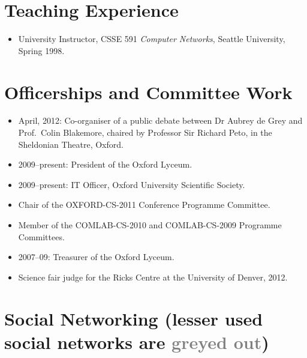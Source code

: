 \documentclass[12pt,letterpaper]{article}
\begin{document}
\vspace{-8mm}
\section*{Teaching Experience}

\begin{itemize}
    \item University Instructor, CSSE 591 \emph{Computer Networks},
    Seattle University, Spring 1998.
\end{itemize}

\vspace{-8mm}
\section*{Officerships and Committee Work}
\begin{itemize}
	\item April, 2012: Co-organiser of a public debate between
		Dr Aubrey de Grey and Prof.\ Colin Blakemore, chaired by Professor Sir Richard Peto,
		in the Sheldonian Theatre, Oxford.
	\item 2009--present: President of the Oxford Lyceum.
	\item 2009--present: IT Officer, Oxford University Scientific Society.
	\item Chair of the OXFORD-CS-2011 Conference Programme Committee.
	\item Member of the COMLAB-CS-2010 and COMLAB-CS-2009 Programme Committees.
	\item 2007--09: Treasurer of the Oxford Lyceum.
	\item Science fair judge for the Ricks Centre at the University of Denver, 2012.
\end{itemize}


\vspace{-8mm}
\section*{Social Networking {\small (lesser used social networks are \textcolor{grey}{greyed out})}}

\end{document}
